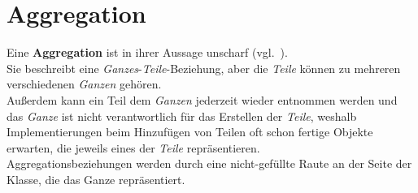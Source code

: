 \section{Aggregation}

\begin{tcolorbox}[title=Aggregation]
    Eine \textbf{Aggregation} ist in ihrer \semantischen Aussage unscharf (vgl.~\cite[40]{Buh09}).\\
    Sie beschreibt eine \textit{Ganzes}-\textit{Teile}-Beziehung, aber die \textit{Teile} können zu mehreren verschiedenen \textit{Ganzen} gehören.\\
    Außerdem kann ein Teil dem \textit{Ganzen} jederzeit wieder entnommen werden und das \textit{Ganze} ist nicht verantwortlich für das Erstellen der \textit{Teile}, weshalb Implementierungen beim Hinzufügen von Teilen oft schon fertige Objekte erwarten, die jeweils eines der \textit{Teile} repräsentieren.\\
    Aggregationsbeziehungen werden durch eine nicht-gefüllte Raute an der Seite der Klasse, die das Ganze repräsentiert.
\end{tcolorbox}